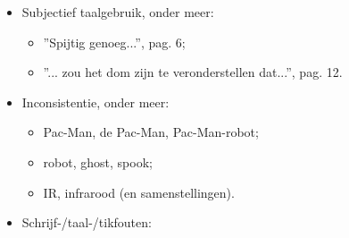 \documentclass[12pt,a4paper]{report}
\begin{document}
\begin{itemize}
	\item Subjectief taalgebruik, onder meer:
	\begin{itemize}
	\item ''Spijtig genoeg...'', pag. 6;
	\item ''... zou het dom zijn te veronderstellen dat...'', pag. 12.
	\end{itemize}
	\item Inconsistentie, onder meer:
\begin{itemize}
	\item Pac-Man, de Pac-Man, Pac-Man-robot;
	\item robot, ghost, spook;
	\item IR, infrarood (en samenstellingen).
\end{itemize}
	\item Schrijf-/taal-/tikfouten:
	

\end{itemize}
\end{document}
